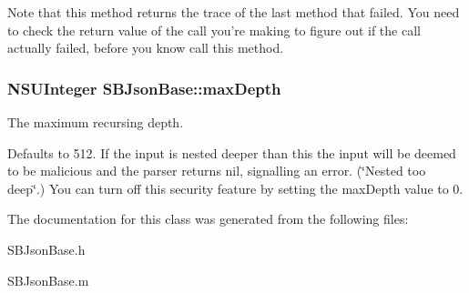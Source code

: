 \-Note that this method returns the trace of the last method that failed. \-You need to check the return value of the call you're making to figure out if the call actually failed, before you know call this method. \hypertarget{interface_s_b_json_base_abe3e47517711570a9a57e2d92a15055b}{
\subsubsection[{max\-Depth}]{\setlength{\rightskip}{0pt plus 5cm}\-N\-S\-U\-Integer \-S\-B\-Json\-Base\-::max\-Depth}}
\label{interface_s_b_json_base_abe3e47517711570a9a57e2d92a15055b}


\-The maximum recursing depth. 

\-Defaults to 512. \-If the input is nested deeper than this the input will be deemed to be malicious and the parser returns nil, signalling an error. (\char`\"{}\-Nested too deep\char`\"{}.) \-You can turn off this security feature by setting the max\-Depth value to 0. 

\-The documentation for this class was generated from the following files\-:\begin{DoxyCompactItemize}
\item 
\-S\-B\-Json\-Base.\-h\item 
\-S\-B\-Json\-Base.\-m\end{DoxyCompactItemize}
